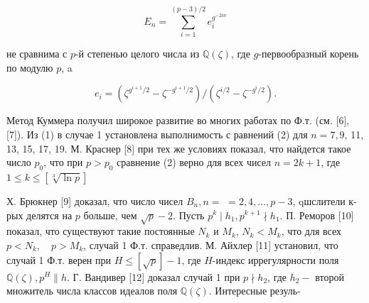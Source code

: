 \documentclass[10pt]{article}
\begin{document}
\[

E_{n}=\sum_{i=1}^{(p-3) / 2} e_{i}^{g^{-2 i n}}

\]



не сравнима с $p$-й степенью целого числа из $\mathbb{Q}(\zeta)$, где $g$-первообразный корень по модулю $p$, a



\[

e_{i}=\left(\zeta^{g^{i+1} / 2}-\zeta^{-g^{i+1} / 2}\right) /\left(\zeta^{i / 2}-\zeta^{-g^{i} / 2}\right) .

\]



Метод Куммера получил широкое развитие во многих работах по Ф.т. (см. [6], [7]). Из (1) в случае 1 установлена выполнимость с равнений (2) для $n=7,9$, 11, 13, 15, 17, 19. М. Краснер [8] при тех же условиях показал, что найдется такое число $p_{0}$, что при $p>p_{0}$ сравнение (2) верно для всех чисел $n=2 k+1$, где $1 \leqslant k \leqslant[\sqrt[3]{\ln p}]$



Х. Брюкнер [9] доказал, что число чисел $B_{n}, n=$ $=2,4, \ldots, p-3$, qшслители к-рых делятся на $p$ больше, чем $\sqrt{p}-2$. Пусть $p^{k} \mid h_{1}, p^{k+1} \nmid h_{1}$. П. Реморов [10] показал, что существуют такие постоянные $N_{k}$ и $M_{k}$, $N_{k}<M_{k}$, что для всех $p<N_{k}, \quad p>M_{k}$, случай 1 Ф.т. справедлив. М. Айхлер [11] установил, что случай 1 Ф.т. верен при $H \leqslant[\sqrt{p}]-1$, где $H$-индекс иррегулярности поля $\mathbb{Q}(\zeta), p^{H} \| h$. Г. Вандивер [12] доказал случай 1 при $p \nmid h_{2}$, где $h_{2}-$ второй множитель числа классов идеалов поля $\mathbb{Q}(\zeta)$. Интересные резуль-
\end{document}
